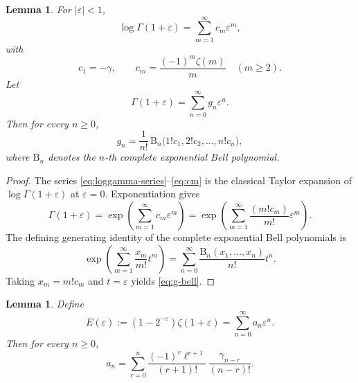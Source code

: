 \documentclass[11pt]{amsart}
\numberwithin{equation}{section}
\newtheorem{lemma}[theorem]{Lemma}
\theoremstyle{definition}
\newcommand{\Bell}{\mathrm{B}}
\begin{document}
\begin{lemma}\label{lem:loggamma-expansion}
For $|\varepsilon|<1$,
\begin{equation}\label{eq:loggamma-series}
\log\Gamma(1+\varepsilon)
=\sum_{m=1}^{\infty}c_{m}\varepsilon^{m},
\end{equation}
with
\begin{equation}\label{eq:cm}
c_{1}=-\gamma,\qquad
c_{m}=\frac{(-1)^{m}\zeta(m)}{m}\quad(m\ge 2).
\end{equation}
Let
\begin{equation}\label{eq:g-def}
\Gamma(1+\varepsilon)=\sum_{n=0}^{\infty}g_{n}\varepsilon^{n}.
\end{equation}
Then for every $n\ge 0$,
\begin{equation}\label{eq:g-bell}
g_{n}
=\frac{1}{n!}\,\Bell_{n}\bigl(1!c_{1},2!c_{2},\dots,n!c_{n}\bigr),
\end{equation}
where $\Bell_{n}$ denotes the $n$-th complete exponential Bell polynomial.
\end{lemma}

\begin{proof}
The series \eqref{eq:loggamma-series}--\eqref{eq:cm} is the classical Taylor
expansion of $\log\Gamma(1+\varepsilon)$ at $\varepsilon=0$. Exponentiation
gives
\[
\Gamma(1+\varepsilon)
=\exp\!\left(\sum_{m=1}^{\infty}c_{m}\varepsilon^{m}\right)
=\exp\!\left(\sum_{m=1}^{\infty}\frac{(m!c_{m})}{m!}\varepsilon^{m}\right).
\]
The defining generating identity of the complete exponential Bell polynomials
is
\[
\exp\!\left(\sum_{m=1}^{\infty}\frac{x_{m}}{m!}t^{m}\right)
=\sum_{n=0}^{\infty}\frac{\Bell_{n}(x_{1},\dots,x_{n})}{n!}t^{n}.
\]
Taking $x_{m}=m!c_{m}$ and $t=\varepsilon$ yields \eqref{eq:g-bell}.
\end{proof}

\begin{lemma}\label{lem:eta-coefficients}
Define
\begin{equation}\label{eq:eta-def}
E(\varepsilon):=(1-2^{-\varepsilon})\zeta(1+\varepsilon)
=\sum_{n=0}^{\infty}a_{n}\varepsilon^{n}.
\end{equation}
Then for every $n\ge 0$,
\begin{equation}\label{eq:a-formula}
a_{n}
=\sum_{r=0}^{n}\frac{(-1)^{r}\ell^{r+1}}{(r+1)!}\,
\frac{\gamma_{n-r}}{(n-r)!}.
\end{equation}
\end{lemma}
\end{document}
